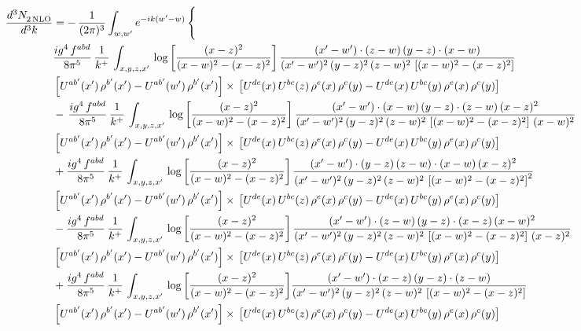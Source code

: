 \documentclass[9pt]{article}
\numberwithin{equation}{section}
\begin{document}
\begin{align}
   \frac{d^{3}N_{2\,\rm NLO}^{\rm}}{d^{3}k}  & =  -\,\frac{1}{(2\pi)^{3}}  \int_{w, w^\prime} e^{-ik(w^\prime-w)}\, \Bigg\{\notag \\ &  \frac{ig^{4}\, f^{abd}}{8\pi^{5}}\, \frac{1}{k^{+}}\, \int_{x,y,z,x'}\,\log{\left[\frac{(x-z)^{2}}{(x-w)^{2}-(x-z)^{2}}\right]}\,\frac{(x'-w')\cdot (z-w)\, (y-z)\cdot (x-w)}{(x'-w')^{2}\, (y-z)^{2}\, (z-w)^{2}\,\left[(x-w)^{2}-(x-z)^{2}\right]}\, \notag \\ & \left[U^{ab'}(x')\,\rho^{b'}(x')-U^{ab'}(w')\, \rho^{b'}(x')\right]\times\,\left[U^{de}(x)\,U^{bc}(z)\, \rho^{e}(x)\,\rho^{c}(y)-U^{de}(x)\,U^{bc}(y)\,\rho^{e}(x)\,\rho^{c}(y)\right] \notag \\
& -\,\frac{ig^{4}\, f^{abd}}{8\pi^{5}}\, \frac{1}{k^{+}}\, \int_{x,y,z,x'}\,\log{\left[\frac{(x-z)^{2}}{(x-w)^{2}-(x-z)^{2}}\right]}\,\frac{(x'-w')\cdot (x-w)\, (y-z)\cdot(z-w)\,(x-z)^{2}}{(x'-w')^{2}\, (y-z)^{2}\, (z-w)^{2}\,\left[(x-w)^{2}-(x-z)^{2}\right]\,(x-w)^{2}}\, \notag \\ & \left[U^{ab'}(x')\,\rho^{b'}(x')-U^{ab'}(w')\, \rho^{b'}(x')\right]\times\,\left[U^{de}(x)\,U^{bc}(z)\, \rho^{e}(x)\,\rho^{c}(y)-U^{de}(x)\,U^{bc}(y)\,\rho^{e}(x)\,\rho^{c}(y)\right] \notag \\
& +\frac{ig^{4}\, f^{abd}}{8\pi^{5}}\, \frac{1}{k^{+}}\, \int_{x,y,z,x'}\,\log{\left[\frac{(x-z)^{2}}{(x-w)^{2}-(x-z)^{2}}\right]}\,\frac{(x'-w')\cdot  (y-z)\, (z-w)\cdot (x-w)\, (x-z)^{2}}{(x'-w')^{2}\, (y-z)^{2}\, (z-w)^{2}\,\left[(x-w)^{2}-(x-z)^{2}\right]^{2}}\, \notag \\ & \left[U^{ab'}(x')\,\rho^{b'}(x')-U^{ab'}(w')\, \rho^{b'}(x')\right]\times\,\left[U^{de}(x)\,U^{bc}(z)\, \rho^{e}(x)\,\rho^{c}(y)-U^{de}(x)\,U^{bc}(y)\,\rho^{e}(x)\,\rho^{c}(y)\right] \notag \\
& - \frac{ig^{4}\, f^{abd}}{8\pi^{5}}\, \frac{1}{k^{+}}\, \int_{x,y,z,x'}\,\log{\left[\frac{(x-z)^{2}}{(x-w)^{2}-(x-z)^{2}}\right]}\,\frac{(x'-w')\cdot (z-w)\, (y-z)\cdot (x-z)\, (x-w)^{2}}{(x'-w')^{2}\, (y-z)^{2}\, (z-w)^{2}\,\left[(x-w)^{2} - (x-z)^{2}\right]\, (x-z)^{2}}\, \notag \\ & \left[U^{ab'}(x')\,\rho^{b'}(x')-U^{ab'}(w')\, \rho^{b'}(x')\right]\times\,\left[U^{de}(x)\,U^{bc}(z)\, \rho^{e}(x)\,\rho^{c}(y)-U^{de}(x)\,U^{bc}(y)\,\rho^{e}(x)\,\rho^{c}(y)\right] \notag \\
& +\frac{ig^{4}\, f^{abd}}{8\pi^{5}}\, \frac{1}{k^{+}}\, \int_{x,y,z,x'}\,\log{\left[\frac{(x-z)^{2}}{(x-w)^{2}-(x-z)^{2}}\right]}\frac{(x'-w')\cdot (x-z)\, (y-z)\cdot (z-w)}{(x'-w')^{2}\, (y-z)^{2}\, (z-w)^{2}\,\left[(x-w)^{2} -(x-z)^{2}\right]}\, \notag \\ & \left[U^{ab'}(x')\,\rho^{b'}(x')-U^{ab'}(w')\, \rho^{b'}(x')\right]\times\,\left[U^{de}(x)\,U^{bc}(z)\, \rho^{e}(x)\,\rho^{c}(y)-U^{de}(x)\,U^{bc}(y)\,\rho^{e}(x)\,\rho^{c}(y)\right] \notag \\

\end{align}
\end{document}
